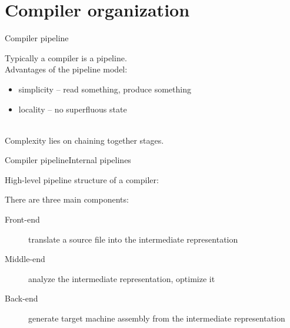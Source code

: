 
\section{Compiler organization}


\begin{frame}{Compiler pipeline}
\begin{center}
Typically a compiler is a \alert{pipeline}.\\
\bigskip
Advantages of the pipeline model:\\
\medskip
\begin{varwidth}{0.8\textwidth}
\begin{itemize}
\item \alert{simplicity} -- read something, produce something
\item \alert{locality} -- no superfluous state
\end{itemize}
\end{varwidth}
\\
\bigskip
Complexity lies on \alert{chaining} together stages.
\end{center}
\end{frame}


\begin{frame}{Compiler pipeline}{Internal pipelines}
\begin{center}
High-level pipeline structure of a compiler:\\
\begin{figure}
\centering

\end{figure}
\medskip
There are three main components:

\begin{description}
\item[Front-end] \alert{translate} a source file into the intermediate representation
\item[Middle-end] \alert{analyze} the intermediate representation, \alert{optimize}
                  it
\item[Back-end] \alert{generate} target machine assembly from the intermediate
                representation
\end{description}
\end{center}
\end{frame}


